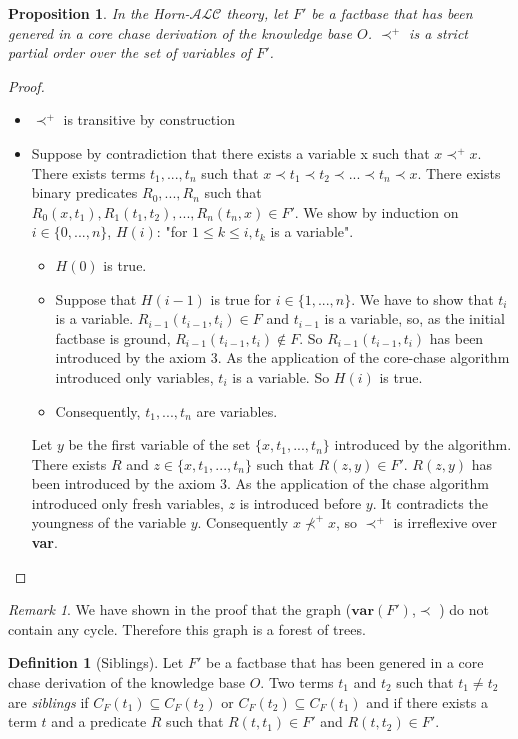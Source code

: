 \documentclass{article}
\newtheorem{proposition}{Proposition}[section]
\theoremstyle{definition}
\newtheorem{definition}{Definition}[section]
\theoremstyle{remark}
\newtheorem{remark}{Remark}[section]
\begin{document}
\begin{proposition}
In the Horn-$\mathcal{ALC}$ theory, let $F'$ be a factbase that has been genered in a core chase derivation of the knowledge base $O$. $\prec^+$ is a strict partial order over the set of variables of $F'$.
\end{proposition}

\begin{proof}
\begin{itemize}
\item $\prec^+$ is transitive by construction
\item Suppose by contradiction that there exists a variable x such that $x \prec^+ x$. There exists terms $t_1,...,t_n$ such that $x \prec t_1 \prec t_2 \prec ... \prec t_n \prec x$. There exists binary predicates $R_0,...,R_n$ such that $R_0(x,t_1),R_1(t_1,t_2),...,R_n(t_n,x) \in F'$. We show by induction on $i\in \{0,...,n\}$, $H(i)$: "for $1 \leq k \leq i,t_k$ is a variable".
\begin{itemize}
\item $H(0)$ is true.
\item Suppose that $H(i-1)$ is true for $i \in \{1,...,n\}$. We have to show that $t_i$ is a variable. $R_{i-1}(t_{i-1},t_i) \in F$ and $t_{i-1}$ is a variable, so, as the initial factbase is ground, $R_{i-1}(t_{i-1},t_i) \notin F$. So $R_{i-1}(t_{i-1},t_i)$ has been introduced by the axiom 3. As the application of the core-chase algorithm introduced only variables, $t_i$ is a variable. So $H(i)$ is true.
\item Consequently, $t_1,...,t_n$ are variables.
\end{itemize}
Let $y$ be the first variable of the set $\{x,t_1,...,t_n\}$  introduced by the algorithm. There exists $R$ and $z \in \{x,t_1,...,t_n\}$ such that $R(z,y) \in F'$. $R(z,y)$ has been introduced by the axiom 3. As the application of the chase algorithm introduced only fresh variables, $z$ is introduced before $y$. It contradicts the youngness of the variable $y$. Consequently $x \nprec^+ x$, so $\prec^+$ is irreflexive over \textbf{var}.
\end{itemize}
\end{proof}

\begin{remark}
We have shown in the proof that the graph ($\textbf{var}(F')$,$\prec$ ) do not contain any cycle. Therefore this graph is a forest of trees.
\end{remark}

\begin{definition}[Siblings]
Let $F'$ be a factbase that has been genered in a core chase derivation of the knowledge base $O$. Two terms $t_1$ and $t_2$ such that $t_1 \neq t_2$ are \emph{siblings} if $C_F(t_1) \subseteq C_F(t_2)$ or $C_F(t_2) \subseteq C_F(t_1)$ and if there exists a term $t$ and a predicate $R$ such that $R(t,t_1) \in F'$ and $R(t,t_2) \in F'$.
\end{definition}
\end{document}
